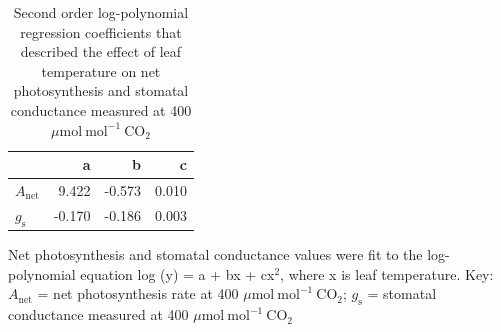 \newpage
\begin{table}[]
    \centering
    \caption{Second order log-polynomial regression coefficients that described the effect of leaf temperature on net photosynthesis and stomatal conductance measured at 400 $\mu \mathrm{mol\ mol^{-1}\ CO_2}$}
    \label{table:tab.b3}
    \begin{tabular}{p{2cm}p{3cm}p{3cm}p{}}  
        \hline
                            & \multicolumn{1}{r}{a}      & \multicolumn{1}{r}{b}      & \multicolumn{1}{r}{c}     \\
        \hline
        $A_\mathrm{net}$    & \multicolumn{1}{r}{9.422}  & \multicolumn{1}{r}{-0.573} & \multicolumn{1}{r}{0.010} \\
        $g_\mathrm{s}$      & \multicolumn{1}{r}{-0.170} & \multicolumn{1}{r}{-0.186} & \multicolumn{1}{r}{0.003}
\end{tabular}%
\end{table}
\begin{singlespace}
    \noindent Net photosynthesis and stomatal conductance values were fit to the log-polynomial equation log (y) = a + bx + cx$^2$, where x is leaf temperature. Key: $A_\mathrm{net}$ = net photosynthesis rate at 400 $\mu \mathrm{mol\ mol^{-1}\ CO_2}$; $g_\mathrm{s}$ = stomatal conductance measured at 400 $\mu \mathrm{mol\ mol^{-1}\ CO_2}$
\end{singlespace}
\clearpage

